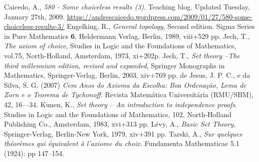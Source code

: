 \documentclass{hipatia}
\begin{document}
%
\begin{thebibliography}{9} \vspace{.5cm}

     {Caicedo, A., {\em 580
    - Some choiceless results (3)}. Teaching
    blog. Updated Tuesday, January 27th,
    2009.
    \url{https://andrescaicedo.wordpress.com/2009/01/27/580-some-choiceless-results-3/}}
     Engelking, R., {\em
    General topology}, Second edition. Sigma
    Series in Pure Mathematics {\bf 6},
    Heldermann Verlag, Berlin, 1989,
    viii+529 pp.  Jech, T.,
    {\em The axiom of choice}, Studies in
    Logic and the Foundations of
    Mathematics, vol.75, North-Holland,
    Amsterdam, 1973, xi+202p.
     Jech, T., {\em Set theory
    --The third millennium edition, revised
    and expanded}, Springer Monographs in
    Mathematics, Springer-Verlag, Berlin,
    2003, xiv+769 pp.
      de Jesus, J.
    P. C., e da Silva, S. G. (2007) {\em Cem
    Anos do Axioma da Escolha: Boa
    Ordenação, Lema de Zorn e o Teorema de
    Tychonoff}. Revista Matemática
    Universitária (RMU/SBM), 42, 16---34.
     Kunen, K., {\em Set
    theory -- An introduction to
    independence proofs}. Studies in Logic
    and the Foundations of Mathematics, 102,
    North-Holland Publishing Co., Amsterdam,
    1983, xvi+313 pp.
     L\'evy, A., {\em Basic
    Set Theory}, Springer-Verlag, Berlin-New
    York, 1979, xiv+391 pp.
     
     {Tarski, A., {\em Sur
    quelques th{\'e}or{\`e}mes qui
    {\'e}quivalent {\`a} l'axiome du choix.}
    Fundamenta Mathematicae 5.1 (1924): pp
    147--154.} 
    \end{thebibliography}
\bigskip
\end{document}
